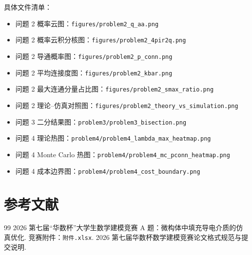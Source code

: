具体文件清单：
\begin{itemize}
    \small
    \item 问题 2 概率云图：\texttt{figures/problem2\_q\_aa.png}
    \item 问题 2 概率云积分核图：\texttt{figures/problem2\_4pir2q.png}
    \item 问题 2 导通概率图：\texttt{figures/problem2\_p\_conn.png}
    \item 问题 2 平均连接度图：\texttt{figures/problem2\_kbar.png}
    \item 问题 2 最大连通分量占比图：\texttt{figures/problem2\_smax\_ratio.png}
    \item 问题 2 理论--仿真对照图：\texttt{figures/problem2\_theory\_vs\_simulation.png}
    \item 问题 3 二分结果图：\texttt{problem3/problem3\_bisection.png}
    \item 问题 4 理论热图：\texttt{problem4/problem4\_lambda\_max\_heatmap.png}
    \item 问题 4 Monte Carlo 热图：\texttt{problem4/problem4\_mc\_pconn\_heatmap.png}
    \item 问题 4 成本边界图：\texttt{problem4/problem4\_cost\_boundary.png}
\end{itemize}

\section*{参考文献}

\begin{thebibliography}{99}
     2026 第七届“华数杯”大学生数学建模竞赛 A 题：微构体中填充导电介质的仿真优化.
     竞赛附件：\texttt{附件.xlsx}.
     2026 第七届华数杯数学建模竞赛论文格式规范与提交说明.
\end{thebibliography}
